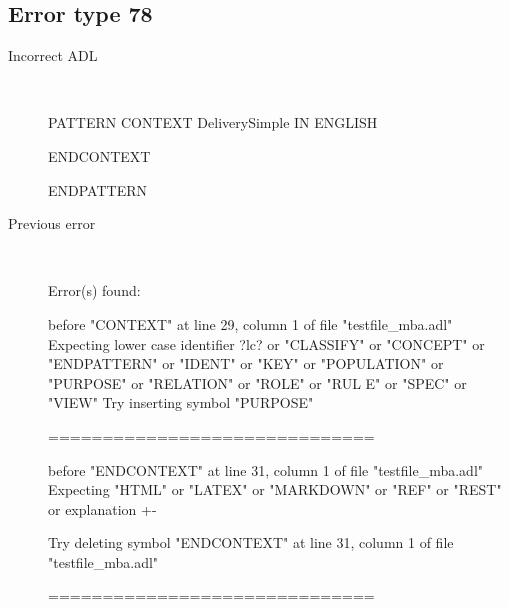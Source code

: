\hrulefill

\subsection{Error type 78}
  \begin{description}
  \item[Incorrect ADL]~\\
\begin{adl}
PATTERN
CONTEXT DeliverySimple IN ENGLISH

ENDCONTEXT

ENDPATTERN\end{adl}
  \item[Previous error]~\\
\begin{haskell}
Error(s) found:

before "CONTEXT" at line 29, column 1 of file "testfile_mba.adl"
Expecting lower case identifier ?lc? or "CLASSIFY" or "CONCEPT" or "ENDPATTERN"
or "IDENT" or "KEY" or "POPULATION" or "PURPOSE" or "RELATION" or "ROLE" or "RUL
E" or "SPEC" or "VIEW"
Try inserting symbol "PURPOSE"

==============================

before "ENDCONTEXT" at line 31, column 1 of file "testfile_mba.adl"
Expecting "HTML" or "LATEX" or "MARKDOWN" or "REF" or "REST" or explanation {+-}

Try deleting symbol "ENDCONTEXT" at line 31, column 1 of file "testfile_mba.adl"


==============================


\end{haskell}
\end{description}

